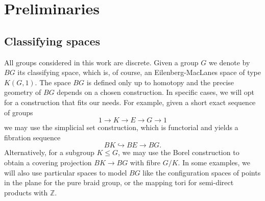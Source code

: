 \documentclass[11pt]{amsart}
\theoremstyle{plain}
\theoremstyle{definition}
\newcommand{\ZZ}{{\mathbb{Z}}}
\begin{document}
\section{Preliminaries}\label{sec:Preliminaries}

\subsection{Classifying spaces}
All groups considered in this work are discrete. Given a group $G$ we denote by $BG$ its classifying 
space,
which is, of course, an Eilenberg-MacLanes space of type $K(G,1)$. The space $BG$ is defined only up to 
homotopy and the precise geometry of $BG$ depends on a chosen construction. In specific cases, we will 
opt for
a construction that fits our needs. For example, given a short exact sequence of groups
$$1\to K\to E\to G\to 1$$ 
we may use the simplicial set construction, which is functorial and yields a fibration sequence
$$ BK\hookrightarrow BE \to BG. $$
Alternatively, for a subgroup $K\le G$, we may use the Borel construction to obtain a covering projection 
$BK\to BG$ with fibre $G/K$. In some examples, we will also use particular spaces to model $BG$ like the 
configuration spaces of points in the plane for the pure braid group, or the mapping tori for semi-direct
products with $\ZZ$.
\end{document}
